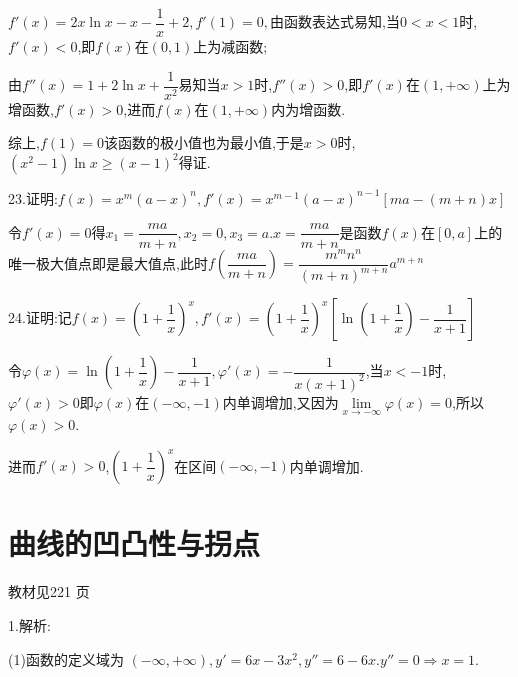 $f'\left( x \right) = 2x\ln x - x - \dfrac{1}{x} + 2,f'\left( 1 \right) = 0,$由函数表达式易知,当$0 < x < 1$时,$f'\left( x \right) < 0$,即$f\left( x \right)$在$\left( {0,1} \right)$上为减函数;

由$f''\left( x \right) = 1 + 2\ln x + \dfrac{1}{{{x^2}}}$易知当$x > 1$时,$f''\left( x \right) > 0$,即$f'\left( x \right)$在$\left( {1, + \infty } \right)$上为增函数,$f'\left( x \right) > 0$,进而$f\left( x \right)$在$\left( {1, + \infty } \right)$内为增函数.

综上,$f\left( 1 \right) = 0$该函数的极小值也为最小值,于是$x > 0$时,$\left( {{x^2} - 1} \right)\ln x \ge {\left( {x - 1} \right)^2}$得证.

23.证明:$f\left( x \right) = {x^m}{\left( {a - x} \right)^n},f'\left( x \right) = {x^{m - 1}}{\left( {a - x} \right)^{n - 1}}\left[ {ma - \left( {m + n} \right)x} \right]$

令$f'\left( x \right) = 0$得${x_1} = \dfrac{{ma}}{{m + n}},{x_2} = 0,{x_3} = a$.$x = \dfrac{{ma}}{{m + n}}$是函数$f\left( x \right)$在$\left[ {0,a} \right]$上的唯一极大值点即是最大值点,此时$f\left( {\dfrac{{ma}}{{m + n}}} \right) = \dfrac{{{m^m}{n^n}}}{{{{\left( {m + n} \right)}^{m + n}}}}{a^{m + n}}$

24.证明:记$f\left( x \right) = {\left( {1 + \dfrac{1}{x}} \right)^x},f'\left( x \right) = {\left( {1 + \dfrac{1}{x}} \right)^x}\left[ {\ln \left( {1 + \dfrac{1}{x}} \right) - \dfrac{1}{{x + 1}}} \right]$

令$\varphi \left( x \right) = \ln \left( {1 + \dfrac{1}{x}} \right) - \dfrac{1}{{x + 1}},\varphi '\left( x \right) =  - \dfrac{1}{{x{{\left( {x + 1} \right)}^2}}}$,当$x <  - 1$时,$\varphi '\left( x \right) > 0$即$\varphi \left( x \right)$在$\left( { - \infty , - 1} \right)$内单调增加,又因为$\mathop {\lim }\limits_{x \to  - \infty } \varphi \left( x \right) = 0$,所以$\varphi \left( x \right) > 0$.

进而$f'\left( x \right) > 0$,${\left( {1 + \dfrac{1}{x}} \right)^x}$在区间$\left( { - \infty , - 1} \right)$内单调增加.


\section{曲线的凹凸性与拐点}
\begin{flushright}
  \color{zhanqing!80}
  \color{zhanqing!80}
   教材见221 页 %
\end{flushright}

1.解析:

(1)函数的定义域为
$\left( { - \infty , + \infty } \right),y' = 6x - 3{x^2},y'' = 6 - 6x.y'' = 0 \Rightarrow x = 1.$


